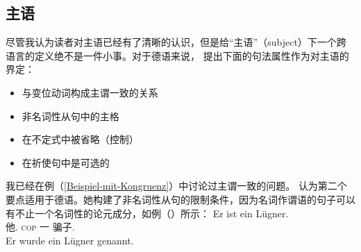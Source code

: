 \subsection{主语}
\label{Abschnitt-Subjekt}
尽管我认为读者对主语已经有了清晰的认识，但是给“主语”（subject）下一个跨语言的定义绝不是一件小事。对于德语来说， \citet{Reis82}提出下面的句法属性作为对主语的界定：
\begin{itemize}
\item 与变位动词构成主谓一致的关系
\item 非名词性从句中的主格
\item 在不定式中被省略（控制）
\item 在祈使句中是可选的
\end{itemize}
我已经在例（\ref{Beispiel-mit-Kongruenz}）中讨论过主谓一致的问题。 \citet{Reis82}认为第二个要点适用于德语。她构建了非名词性从句的限制条件，因为名词作谓语的句子可以有不止一个名词性的论元成分，如例（）所示：
\eal
\ex
\gll Er ist ein Lügner.\\
     他.\nom{} \textsc{cop} 一 骗子.\nom{}\\
\ex 
\gll Er wurde ein Lügner genannt.\\
